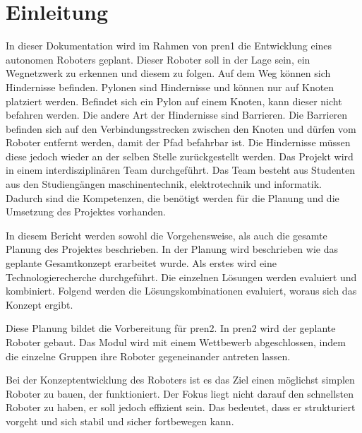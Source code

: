 \section{Einleitung}

In dieser Dokumentation wird im Rahmen von \acrfull{pren1} die Entwicklung eines autonomen Roboters geplant. Dieser Roboter soll in der Lage sein, ein Wegnetzwerk zu erkennen und diesem zu folgen. Auf dem Weg können sich Hindernisse befinden. Pylonen sind Hindernisse und können nur auf Knoten platziert werden. Befindet sich ein Pylon auf einem Knoten, kann dieser nicht befahren werden. Die andere Art der Hindernisse sind Barrieren. Die Barrieren befinden sich auf den Verbindungsstrecken zwischen den Knoten und dürfen vom Roboter entfernt werden, damit der Pfad befahrbar ist. Die Hindernisse müssen diese jedoch wieder an der selben Stelle zurückgestellt werden.
Das Projekt wird in einem interdisziplinären Team durchgeführt. Das Team besteht aus Studenten aus den Studiengängen \acrfull{maschinentechnik}, \acrfull{elektrotechnik} und \acrfull{informatik}. Dadurch sind die Kompetenzen, die benötigt werden für die Planung und die Umsetzung des Projektes vorhanden.

In diesem Bericht werden sowohl die Vorgehensweise, als auch die gesamte Planung des Projektes beschrieben. In der Planung wird beschrieben wie das geplante Gesamtkonzept erarbeitet wurde. Als erstes wird eine Technologierecherche durchgeführt. Die einzelnen Lösungen werden evaluiert und kombiniert. Folgend werden die Lösungskombinationen evaluiert, woraus sich das Konzept ergibt.

Diese Planung bildet die Vorbereitung für \acrfull{pren2}. In \acrshort{pren2} wird der geplante Roboter gebaut. Das Modul wird mit einem Wettbewerb abgeschlossen, indem die einzelne Gruppen ihre Roboter gegeneinander antreten lassen.

Bei der Konzeptentwicklung des Roboters ist es das Ziel einen möglichst simplen Roboter zu bauen, der funktioniert. Der Fokus liegt nicht darauf den schnellsten Roboter zu haben, er soll jedoch effizient sein. Das bedeutet, dass er strukturiert vorgeht und sich stabil und sicher fortbewegen kann.
